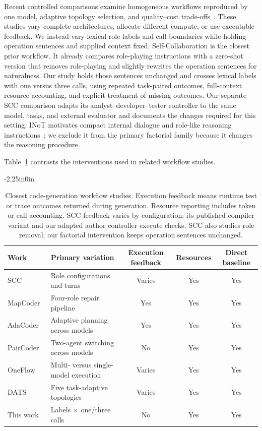 \documentclass[10pt,letterpaper]{article}
\begin{document}
Recent controlled comparisons examine homogeneous workflows reproduced by one model, adaptive topology selection, and quality--cost trade-offs~\cite{xu2026oneflow,hong2026dats,kapoor2025agents}. These studies vary complete architectures, allocate different compute, or use executable feedback. We instead vary lexical role labels and call boundaries while holding operation sentences and supplied context fixed. Self-Collaboration is the closest prior workflow. It already compares role-playing instructions with a zero-shot version that removes role-playing and slightly rewrites the operation sentences for naturalness. Our study holds those sentences unchanged and crosses lexical labels with one versus three calls, using repeated task-paired outcomes, full-context resource accounting, and explicit treatment of missing outcomes. Our separate SCC comparison adapts its analyst--developer--tester controller to the same model, tasks, and external evaluator and documents the changes required for this setting. INoT motivates compact internal dialogue and role-like reasoning instructions~\cite{sun2025inot}; we exclude it from the primary factorial family because it changes the reasoning procedure.

Table~\ref{tab:related-designs} contrasts the interventions used in related workflow studies.

\FloatBarrier
\begin{table}[!ht]
\begin{adjustwidth}{-2.25in}{0in}
\caption{Closest code-generation workflow studies. Execution feedback means runtime test or trace outcomes returned during generation. Resource reporting includes token or call accounting. SCC feedback varies by configuration: its published compiler variant and our adapted author controller execute checks. SCC also studies role removal; our factorial intervention keeps operation sentences unchanged.}
\label{tab:related-designs}
\centering\footnotesize
\begin{tabularx}{\linewidth}{@{}lXccc@{}}
\toprule
Work & Primary variation & Execution feedback & Resources & Direct baseline\\
\midrule
SCC~\cite{dong2023selfcollaboration} & Role configurations and turns & Varies & Yes & Yes\\
MapCoder~\cite{islam2024mapcoder} & Four-role repair pipeline & Yes & Yes & Yes\\
AdaCoder~\cite{zhu2026adacoder} & Adaptive planning across models & Yes & Yes & Yes\\
PairCoder~\cite{chen2026paircoder} & Two-agent switching across models & No & Yes & Yes\\
OneFlow~\cite{xu2026oneflow} & Multi- versus single-model execution & Varies & Yes & Yes\\
DATS~\cite{hong2026dats} & Five task-adaptive topologies & Varies & Yes & Yes\\
This work & Labels $\times$ one/three calls & No & Yes & Yes\\
\bottomrule
\end{tabularx}
\end{adjustwidth}
\end{table}
\FloatBarrier
\end{document}
